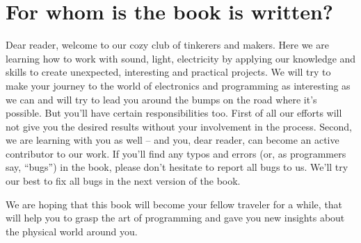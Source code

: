\documentclass[../sparc.tex]{subfiles}
\begin{document}
\section*{For whom is the book is written?}

Dear reader, welcome to our cozy club of tinkerers and makers.  Here we are
learning how to work with sound, light, electricity by applying our knowledge
and skills to create unexpected, interesting and practical projects.  We will
try to make your journey to the world of electronics and programming as
interesting as we can and will try to lead you around the bumps on the road
where it's possible.  But you'll have certain responsibilities too.  First of
all our efforts will not give you the desired results without your involvement
in the process.  Second, we are learning with you as well -- and you, dear
reader, can become an active contributor to our work.  If you'll find any typos
and errors (or, as programmers say, ``bugs'') in the book, please don't hesitate
to report all bugs to us.  We'll try our best to fix all bugs in the next
version of the book.

We are hoping that this book will become your fellow traveler for a while, that
will help you to grasp the art of programming and gave you new insights about
the physical world around you.
\end{document}

